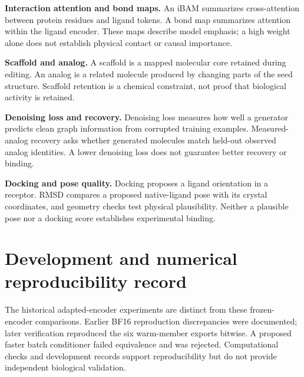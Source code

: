 \documentclass[12pt,a4paper]{article}
\begin{document}
\textbf{Interaction attention and bond maps.} An iBAM summarizes cross-attention between protein residues and ligand tokens. A bond map summarizes attention within the ligand encoder. These maps describe model emphasis; a high weight alone does not establish physical contact or causal importance.

\textbf{Scaffold and analog.} A scaffold is a mapped molecular core retained during editing. An analog is a related molecule produced by changing parts of the seed structure. Scaffold retention is a chemical constraint, not proof that biological activity is retained.

\textbf{Denoising loss and recovery.} Denoising loss measures how well a generator predicts clean graph information from corrupted training examples. Measured-analog recovery asks whether generated molecules match held-out observed analog identities. A lower denoising loss does not guarantee better recovery or binding.

\textbf{Docking and pose quality.} Docking proposes a ligand orientation in a receptor. RMSD compares a proposed native-ligand pose with its crystal coordinates, and geometry checks test physical plausibility. Neither a plausible pose nor a docking score establishes experimental binding.

\section*{Development and numerical reproducibility record}
The historical adapted-encoder experiments are distinct from these frozen-encoder comparisons. Earlier BF16 reproduction discrepancies were documented; later verification reproduced the six warm-member exports bitwise. A proposed faster batch conditioner failed equivalence and was rejected. Computational checks and development records support reproducibility but do not provide independent biological validation.
\end{document}
